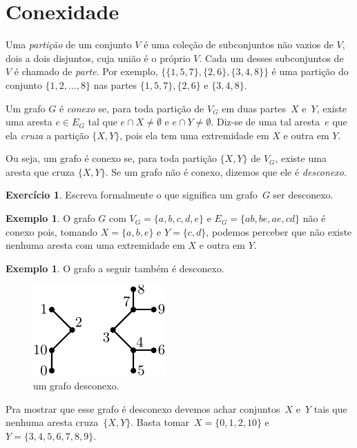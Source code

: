 \documentclass[12pt, a4paper]{article}
\theoremstyle{definition}
\newtheorem{exem}[teor]{Exemplo}
\newtheorem{exer}{Exercício}
\begin{document}
\section{Conexidade}

Uma \emph{partição} de um conjunto $V$ é uma coleção de subconjuntos não vazios de $V$, dois a dois disjuntos, cuja união é o próprio $V$. Cada um desses subconjuntos de~$V$ é chamado de \emph{parte}. Por exemplo, $\big\{\{1, 5, 7\}, \{2, 6\}, \{3, 4, 8\}\big\}$ é uma partição do conjunto $\{1, 2, \dots, 8\}$ nas partes $\{1, 5, 7\}, \{2, 6\}$ e $\{3, 4, 8\}$.

Um grafo $G$ é \emph{conexo} se, para toda partição de $V_G$ em duas partes~$X$ e~$Y$, existe uma aresta $e \in E_G$ tal que $e \cap X \neq \emptyset$ e $e \cap Y \neq \emptyset$. Diz-se de uma tal aresta~$e$ que ela \emph{cruza} a partição $\{X,Y\}$, pois ela tem uma extremidade em $X$ e outra em $Y$.

Ou seja, um grafo é conexo se, para toda partição $\{X,Y\}$ de $V_G$, existe uma aresta que cruza $\{X,Y\}$. Se um grafo não é conexo, dizemos que ele é \emph{desconexo}.

\begin{exer}
Escreva formalmente o que significa um grafo~$G$ ser desconexo.
\end{exer}

\begin{exem}
O grafo $G$ com $V_G = \{a, b, c, d, e\}$ e $E_G = \{ab, be, ae, cd\}$ não é conexo pois, tomando $X = \{a, b, e\}$ e $Y = \{c, d\}$, podemos perceber que não existe nenhuma aresta com uma extremidade em $X$ e outra em $Y$. 
\end{exem}

\begin{exem}
  O grafo a seguir também é desconexo.
  \begin{figure}[H]
      \centering
      \includegraphics{desconexo-1.pdf}
      \caption{um grafo desconexo.}
      \label{fig:desc}
  \end{figure}
  \noindent Pra mostrar que esse grafo é desconexo devemos achar
  conjuntos~$X$ e~$Y$ tais que nenhuma aresta cruza~$\{X,Y\}$. Basta tomar~$X = \{0, 1, 2, 10\}$ e $Y = \{3, 4, 5, 6, 7, 8, 9\}$.
\end{exem}
\end{document}
